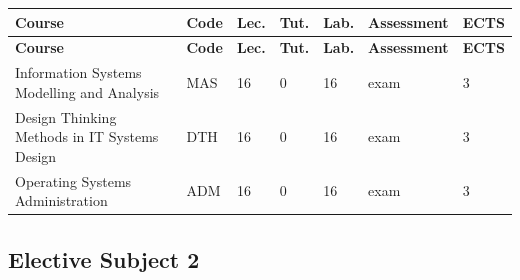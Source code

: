 \documentclass[12pt,a4paper]{article}
\newcommand{\thdrule}{\noalign{\global\setlength{\extrarowheight}{0pt}}}
\newcommand{\thdend}{\noalign{\global\setlength{\extrarowheight}{4pt}}}
\begin{document}
{\scriptsize
\begin{longtable}{m{5.5cm}m{0.8cm}m{1cm}m{1cm}m{1cm}m{1.7cm}m{0.7cm}}
\thdrule\toprule
\rowcolor{pjatkRed}
{\color{white}\footnotesize\textbf{\vphantom{Ag}Course}} & {\color{white}\footnotesize\textbf{\vphantom{Ag}Code}} & {\color{white}\footnotesize\textbf{\vphantom{Ag}Lec.}} & {\color{white}\footnotesize\textbf{\vphantom{Ag}Tut.}} & {\color{white}\footnotesize\textbf{\vphantom{Ag}Lab.}} & {\color{white}\footnotesize\textbf{\vphantom{Ag}Assessment}} & {\color{white}\footnotesize\textbf{\vphantom{Ag}ECTS}} \\
\midrule\thdend
\endfirsthead
\thdrule\toprule
\rowcolor{pjatkRed}
{\color{white}\footnotesize\textbf{\vphantom{Ag}Course}} & {\color{white}\footnotesize\textbf{\vphantom{Ag}Code}} & {\color{white}\footnotesize\textbf{\vphantom{Ag}Lec.}} & {\color{white}\footnotesize\textbf{\vphantom{Ag}Tut.}} & {\color{white}\footnotesize\textbf{\vphantom{Ag}Lab.}} & {\color{white}\footnotesize\textbf{\vphantom{Ag}Assessment}} & {\color{white}\footnotesize\textbf{\vphantom{Ag}ECTS}} \\
\midrule\thdend
\endhead
\rowcolor{tableRowLight} Information Systems Modelling and Analysis & MAS & 16 & 0 & 16 & {\scriptsize exam} & 3 \\
\rowcolor{tableRowAlt} Design Thinking Methods in IT Systems Design & DTH & 16 & 0 & 16 & {\scriptsize exam} & 3 \\
\rowcolor{tableRowLight} Operating Systems Administration & ADM & 16 & 0 & 16 & {\scriptsize exam} & 3 \\
\bottomrule
\end{longtable}}

\subsection*{Elective Subject 2}
\end{document}
